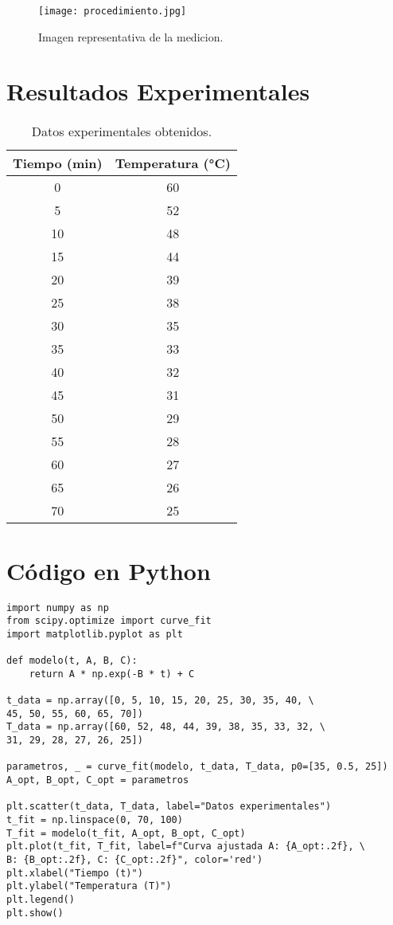 \documentclass[a4paper,12pt]{article}
\begin{document}
\begin{figure}[H]
    \centering
    \texttt{[image: procedimiento.jpg]} %
    \caption{Imagen representativa de la medicion.}
\end{figure}

\section{Resultados Experimentales}
\begin{table}[H]
    \centering
    \begin{tabular}{|c|c|}
        \hline
        Tiempo (min) & Temperatura (°C) \\
        \hline
        0  & 60 \\
        5  & 52 \\
        10 & 48 \\
        15 & 44 \\
        20 & 39 \\
        25 & 38 \\
        30 & 35 \\
        35 & 33 \\
        40 & 32 \\
        45 & 31 \\
        50 & 29 \\
        55 & 28 \\
        60 & 27 \\
        65 & 26 \\
        70 & 25 \\
        \hline
    \end{tabular}
    \caption{Datos experimentales obtenidos.}
\end{table}

\section{Código en Python}
\begin{verbatim}
import numpy as np
from scipy.optimize import curve_fit
import matplotlib.pyplot as plt

def modelo(t, A, B, C):
    return A * np.exp(-B * t) + C

t_data = np.array([0, 5, 10, 15, 20, 25, 30, 35, 40, \
45, 50, 55, 60, 65, 70])
T_data = np.array([60, 52, 48, 44, 39, 38, 35, 33, 32, \
31, 29, 28, 27, 26, 25])

parametros, _ = curve_fit(modelo, t_data, T_data, p0=[35, 0.5, 25])
A_opt, B_opt, C_opt = parametros

plt.scatter(t_data, T_data, label="Datos experimentales")
t_fit = np.linspace(0, 70, 100)
T_fit = modelo(t_fit, A_opt, B_opt, C_opt)
plt.plot(t_fit, T_fit, label=f"Curva ajustada A: {A_opt:.2f}, \
B: {B_opt:.2f}, C: {C_opt:.2f}", color='red')
plt.xlabel("Tiempo (t)")
plt.ylabel("Temperatura (T)")
plt.legend()
plt.show()
\end{verbatim}
\end{document}
